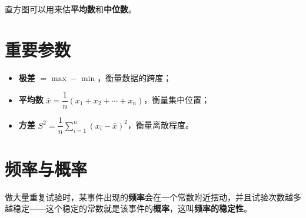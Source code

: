 直方图可以用来估\textbf{平均数}和\textbf{中位数}。

\section{重要参数}

\begin{itemize}
    \item \textbf{极差} $=\max-\min$，衡量数据的跨度；
    \item \textbf{平均数} $\bar{x}=\dfrac{1}{n}(x_1+x_2+\cdots+x_n)$，衡量集中位置；
    \item \textbf{方差} $S^2=\dfrac{1}{n}\displaystyle\sum_{i=1}^{n}(x_i-\bar{x})^2$，衡量离散程度。
\end{itemize}


\section{频率与概率}

做大量重复试验时，某事件出现的\textbf{频率}会在一个常数附近摆动，并且试验次数越多越稳定——这个稳定的常数就是该事件的\textbf{概率}，这叫\textbf{频率的稳定性}。
